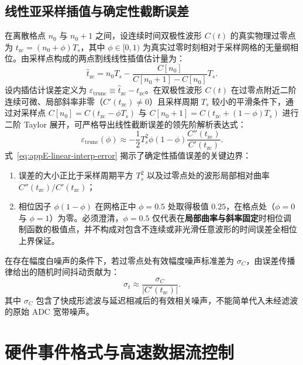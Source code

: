 \subsection{线性亚采样插值与确定性截断误差}

在离散格点 $n_0$ 与 $n_0 + 1$ 之间，设连续时间双极性波形 $C(t)$ 的真实物理过零点为 $t_{\mathrm{zc}} = (n_0 + \phi) T_s$，其中 $\phi \in [0, 1)$ 为真实过零时刻相对于采样网格的无量纲相位。由采样点构成的两点割线线性插值估计量为：
\begin{equation}\label{eq:appE-cfd-subsample}
\widehat{t}_{\mathrm{zc}} = n_0 T_s - \frac{C[n_0]}{C[n_0 + 1] - C[n_0]} T_s.
\end{equation}
设内插估计误差定义为 $\varepsilon_{\mathrm{trunc}} \equiv \widehat{t}_{\mathrm{zc}} - t_{\mathrm{zc}}$。在双极性波形 $C(t)$ 在过零点附近二阶连续可微、局部斜率非零（$C'(t_{\mathrm{zc}}) \ne 0$）且采样周期 $T_s$ 较小的平滑条件下，通过对采样点 $C[n_0] = C(t_{\mathrm{zc}} - \phi T_s)$ 与 $C[n_0+1] = C(t_{\mathrm{zc}} + (1-\phi) T_s)$ 进行二阶 Taylor 展开，可严格导出线性截断误差的领先阶解析表达式：
\begin{equation}\label{eq:appE-linear-interp-error}
\varepsilon_{\mathrm{trunc}}(\phi) \approx -\frac{1}{2} T_s^2 \phi (1 - \phi) \frac{C''(t_{\mathrm{zc}})}{C'(t_{\mathrm{zc}})}.
\end{equation}
式~\eqref{eq:appE-linear-interp-error} 揭示了确定性插值误差的关键边界：
\begin{enumerate}
\item 误差的大小正比于采样周期平方 $T_s^2$ 以及过零点处的波形局部相对曲率 $C''(t_{\mathrm{zc}}) / C'(t_{\mathrm{zc}})$；
\item 相位因子 $\phi(1 - \phi)$ 在网格正中 $\phi = 0.5$ 处取得极值 $0.25$，在格点处（$\phi = 0$ 与 $\phi = 1$）为零。必须澄清，$\phi = 0.5$ 仅代表在\textbf{局部曲率与斜率固定}时相位调制函数的极值点，并不构成对包含不连续或非光滑任意波形的时间误差全相位上界保证。
\end{enumerate}

在存在幅度白噪声的条件下，若过零点处有效幅度噪声标准差为 $\sigma_C$，由误差传播律给出的随机时间抖动贡献为：
\begin{equation}\label{eq:appE-timing-jitter}
\sigma_t \approx \frac{\sigma_C}{|C'(t_{\mathrm{zc}})|}.
\end{equation}
其中 $\sigma_C$ 包含了快成形滤波与延迟相减后的有效相关噪声，不能简单代入未经滤波的原始 ADC 宽带噪声。

\section{硬件事件格式与高速数据流控制}\label{sec:appE-packet-format}

